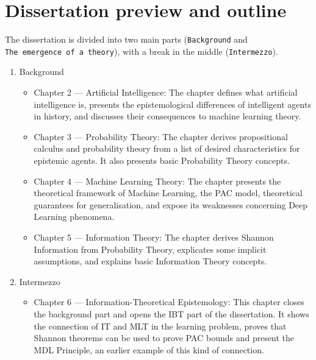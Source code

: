 \documentclass[
  letterpaper,
  12pt,
  british]{tufte-book}
\providecommand{\tightlist}{%
  \setlength{\itemsep}{0pt}\setlength{\parskip}{0pt}}\usepackage{longtable,booktabs,array}
\theoremstyle{plain}
\theoremstyle{definition}
\theoremstyle{plain}
\theoremstyle{remark}
\begin{document}
\hypertarget{dissertation-preview-and-outline}{%
\section{Dissertation preview and
outline}\label{dissertation-preview-and-outline}}

The dissertation is divided into two main parts (\texttt{Background} and
\texttt{The\ emergence\ of\ a\ theory}), with a break in the middle
(\texttt{Intermezzo}).

\begin{enumerate}
\def\labelenumi{\arabic{enumi}.}
\item
  Background

  \begin{itemize}
  \item
    Chapter 2 --- Artificial Intelligence: The chapter defines what
    artificial intelligence is, presents the epistemological differences
    of intelligent agents in history, and discusses their consequences
    to machine learning theory.
  \item
    Chapter 3 --- Probability Theory: The chapter derives propositional
    calculus and probability theory from a list of desired
    characteristics for epistemic agents. It also presents basic
    Probability Theory concepts.
  \item
    Chapter 4 --- Machine Learning Theory: The chapter presents the
    theoretical framework of Machine Learning, the PAC model,
    theoretical guarantees for generalisation, and expose its weaknesses
    concerning Deep Learning phenomena.
  \item
    Chapter 5 --- Information Theory: The chapter derives Shannon
    Information from Probability Theory, explicates some implicit
    assumptions, and explains basic Information Theory concepts.
  \end{itemize}
\item
  Intermezzo

  \begin{itemize}
  \tightlist
  \item
    Chapter 6 --- Information-Theoretical Epistemology: This chapter
    closes the background part and opens the IBT part of the
    dissertation. It shows the connection of {IT} and {MLT} in the
    learning problem, proves that Shannon theorems can be used to prove
    PAC bounds and present the {MDL} Principle, an earlier example of
    this kind of connection.
  \end{itemize}
\end{enumerate}
\end{document}
